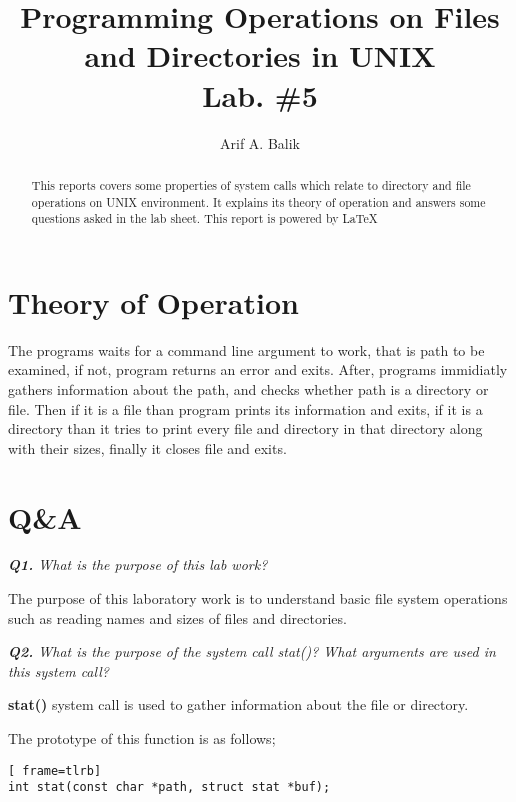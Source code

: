 \documentclass[11pt]{article}
\title{Programming Operations on Files and Directories in UNIX \\Lab. \#5}
\author{Arif A. Balik}
\affil{Undergraduate Student\\
	Sytstems Programming\\
	Department of Computer Science\\
	Arel University\\
	Büyükçekmece, İstanbul 34537\\
    Email: arifbalik@outlook.com
}
\begin{document}
\maketitle

\begin{abstract}

This reports covers some properties of system calls which relate to directory and file operations on UNIX environment. It explains its theory of operation and answers some questions asked in the lab sheet.
This report is powered by \LaTeX{}
\end{abstract}

\section*{Theory of Operation}

The programs waits for a command line argument to work, that is path to be examined, if not, program returns an error and exits. After, programs immidiatly gathers information about the path, and checks whether path is a directory or file. Then if it is a file than program prints its information and exits, if it is a directory than it tries to print every file and directory in that directory along with their sizes, finally it closes file and exits.

\newpage
\section*{Q\&A}

\vspace{3mm}
\textit{\textbf{Q1.} What is the purpose of this lab work?}
\vspace{3mm}

The purpose of this laboratory work is to understand basic file system operations such as reading names and sizes of files and directories.

\vspace{3mm}
\textit{\textbf{Q2.} What is the purpose of the system call stat()? What arguments are used in this system call?}
\vspace{3mm}

\textbf{stat()} system call is used to gather information about the file or directory. 

The prototype of this function is as follows;

\vspace{5mm}
\begin{minipage}{1\textwidth}
\begin{lstlisting}[ frame=tlrb]
int stat(const char *path, struct stat *buf);
\end{lstlisting}
\end{minipage}
\end{document}
